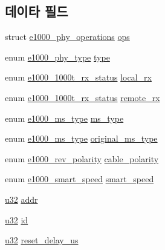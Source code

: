 \subsection*{데이타 필드}
\begin{DoxyCompactItemize}
\item 
struct \hyperlink{structe1000__phy__operations}{e1000\+\_\+phy\+\_\+operations} \hyperlink{structe1000__phy__info_a60c9cd1642eed1c082fd37283740fdc9}{ops}
\item 
enum \hyperlink{kmod_2igb_2e1000__hw_8h_a08193cfbe8cbed68a29346e24c190c87}{e1000\+\_\+phy\+\_\+type} \hyperlink{structe1000__phy__info_aac926af1392edf6d37cc0a5ad3795e1c}{type}
\item 
enum \hyperlink{kmod_2igb_2e1000__hw_8h_a4be1ef8c6e0945434b9ebbe5aad360ed}{e1000\+\_\+1000t\+\_\+rx\+\_\+status} \hyperlink{structe1000__phy__info_ad7e8f7fab63d6d04eabcdf2007662073}{local\+\_\+rx}
\item 
enum \hyperlink{kmod_2igb_2e1000__hw_8h_a4be1ef8c6e0945434b9ebbe5aad360ed}{e1000\+\_\+1000t\+\_\+rx\+\_\+status} \hyperlink{structe1000__phy__info_a55d14440fe8866da55bdfd5af6392813}{remote\+\_\+rx}
\item 
enum \hyperlink{kmod_2igb_2e1000__hw_8h_add70919b7afb66e246c4b6b48220ba52}{e1000\+\_\+ms\+\_\+type} \hyperlink{structe1000__phy__info_ae903e4f11d17a2c115411d89a6816398}{ms\+\_\+type}
\item 
enum \hyperlink{kmod_2igb_2e1000__hw_8h_add70919b7afb66e246c4b6b48220ba52}{e1000\+\_\+ms\+\_\+type} \hyperlink{structe1000__phy__info_a7786be3a20936ae07e10797f5dc0c0ed}{original\+\_\+ms\+\_\+type}
\item 
enum \hyperlink{kmod_2igb_2e1000__hw_8h_ae07fcfec89de069dcab5987f8538b5fc}{e1000\+\_\+rev\+\_\+polarity} \hyperlink{structe1000__phy__info_a8aaf615dd6cbdaf0d13656ea0edd61ce}{cable\+\_\+polarity}
\item 
enum \hyperlink{kmod_2igb_2e1000__hw_8h_a966a4348f1ee680dbc620ccd754e695b}{e1000\+\_\+smart\+\_\+speed} \hyperlink{structe1000__phy__info_a3708e71dff26bfbdcdfa0ef3b5d2f869}{smart\+\_\+speed}
\item 
\hyperlink{lib_2igb_2e1000__osdep_8h_a64e91c10a0d8fb627e92932050284264}{u32} \hyperlink{structe1000__phy__info_a9ac6ce0ce824ca84feafe5837fc9aa9a}{addr}
\item 
\hyperlink{lib_2igb_2e1000__osdep_8h_a64e91c10a0d8fb627e92932050284264}{u32} \hyperlink{structe1000__phy__info_a76f8ba65ce8f902c0657233adee58698}{id}
\item 
\hyperlink{lib_2igb_2e1000__osdep_8h_a64e91c10a0d8fb627e92932050284264}{u32} \hyperlink{structe1000__phy__info_a4f6536113c0430432056bb36bd390e12}{reset\+\_\+delay\+\_\+us}

\end{DoxyCompactItemize}

